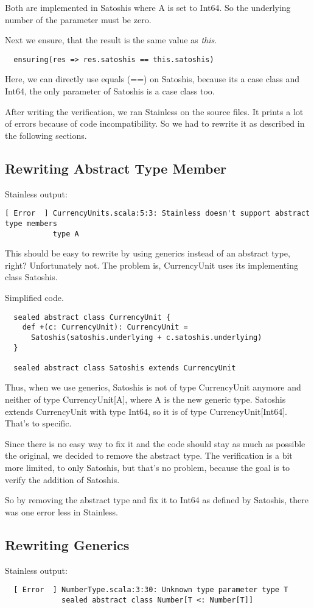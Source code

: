 Both are implemented in Satoshis where A is set to Int64.
So the underlying number of the parameter must be zero.

Next we ensure, that the result is the same value as \emph{this}.
\begin{lstlisting}
  ensuring(res => res.satoshis == this.satoshis)
\end{lstlisting}
Here, we can directly use equals (==) on Satoshis, because its a case class and Int64, the only parameter of Satoshis is a case class too.

After writing the verification, we ran Stainless on the source files.
It prints a lot of errors because of code incompatibility.
So we had to rewrite it as described in the following sections.

\subsection{Rewriting Abstract Type Member}
Stainless output:
\begin{lstlisting}
[ Error  ] CurrencyUnits.scala:5:3: Stainless doesn't support abstract type members
           type A
\end{lstlisting}
This should be easy to rewrite by using generics instead of an abstract type, right?
Unfortunately not.
The problem is, CurrencyUnit uses its implementing class Satoshis.

Simplified code.
\begin{lstlisting}
  sealed abstract class CurrencyUnit {
    def +(c: CurrencyUnit): CurrencyUnit =
      Satoshis(satoshis.underlying + c.satoshis.underlying)
  }

  sealed abstract class Satoshis extends CurrencyUnit
\end{lstlisting}
Thus, when we use generics, Satoshis is not of type CurrencyUnit anymore and neither of type CurrencyUnit[A], where A is the new generic type.
Satoshis extends CurrencyUnit with type Int64, so it is of type CurrencyUnit[Int64].
That's to specific.

Since there is no easy way to fix it and the code should stay as much as possible the original, we decided to remove the abstract type.
The verification is a bit more limited, to only Satoshis, but that's no problem, because the goal is to verify the addition of Satoshis.

So by removing the abstract type and fix it to Int64 as defined by Satoshis, there was one error less in Stainless.

\subsection{Rewriting Generics}
Stainless output:
\begin{lstlisting}
  [ Error  ] NumberType.scala:3:30: Unknown type parameter type T
             sealed abstract class Number[T <: Number[T]]

\end{lstlisting}

